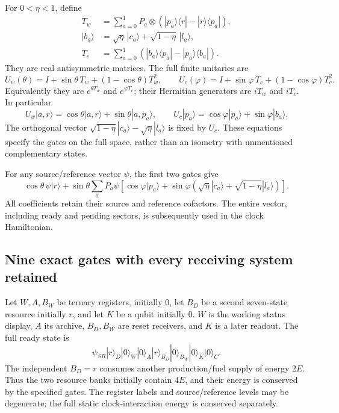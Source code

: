 \documentclass[11pt]{article}
\theoremstyle{definition}\newtheorem{definition}[theorem]{Definition}
\theoremstyle{remark}\newtheorem{remark}[theorem]{Remark}
\begin{document}
For $0<\eta<1$, define
\begin{align}\label{mat:generators}
 T_w&=\sum_{a=0}^1P_a\otimes
       (|p_a\rangle\langle r|-|r\rangle\langle p_a|),\\
 |b_a\rangle&=\sqrt\eta\,|c_a\rangle+
                   \sqrt{1-\eta}\,|l_a\rangle,\nonumber\\
 T_c&=\sum_{a=0}^1
       (|b_a\rangle\langle p_a|-|p_a\rangle\langle b_a|).
       \nonumber
\end{align}
They are real antisymmetric matrices.  The full finite unitaries are
\begin{equation}\label{mat:rotations}
 U_w(\theta)=I+\sin\theta\,T_w+(1-\cos\theta)T_w^2,
 \qquad
 U_c(\varphi)=I+\sin\varphi\,T_c+(1-\cos\varphi)T_c^2.
\end{equation}
Equivalently they are $e^{\theta T_w}$ and $e^{\varphi T_c}$; their
Hermitian generators are $iT_w$ and $iT_c$.  In particular
\[
 U_w|a,r\rangle=\cos\theta|a,r\rangle+
                       \sin\theta|a,p_a\rangle,
 \qquad
 U_c|p_a\rangle=\cos\varphi|p_a\rangle+
                       \sin\varphi|b_a\rangle.
\]
The orthogonal vector
$\sqrt{1-\eta}|c_a\rangle-\sqrt\eta|l_a\rangle$ is fixed by $U_c$.
These equations specify the gates on the full space, rather than an
isometry with unmentioned complementary states.

For any source/reference vector $\psi$, the first two gates give
\begin{equation}\label{mat:resourcevector}
 \cos\theta\,\psi|r\rangle+
 \sin\theta\sum_aP_a\psi
 \left[\cos\varphi|p_a\rangle+
 \sin\varphi\left(\sqrt\eta|c_a\rangle+
                       \sqrt{1-\eta}|l_a\rangle\right)\right].
\end{equation}
All coefficients retain their source and reference cofactors.  The
entire vector, including ready and pending sectors, is subsequently
used in the clock Hamiltonian.

\subsection{Nine exact gates with every receiving system retained}

Let $W,A,B_W$ be ternary registers, initially $0$, let $B_D$ be a
second seven-state resource initially $r$, and let $K$ be a qubit
initially $0$.  $W$ is the working status display, $A$ its archive,
$B_D,B_W$ are reset receivers, and $K$ is a later readout.  The full
ready state is
\begin{equation}\label{mat:ready}
 \psi_{SR}|r\rangle_D|0\rangle_W|0\rangle_A
 |r\rangle_{B_D}|0\rangle_{B_W}|0\rangle_K|0\rangle_C.
\end{equation}
The independent $B_D=r$ consumes another production/fuel supply of
energy $2E$.  Thus the two resource banks initially contain $4E$,
and their energy is conserved by the specified gates.  The register
labels and source/reference levels may be degenerate; the full
static clock-interaction energy is conserved separately.
\end{document}
